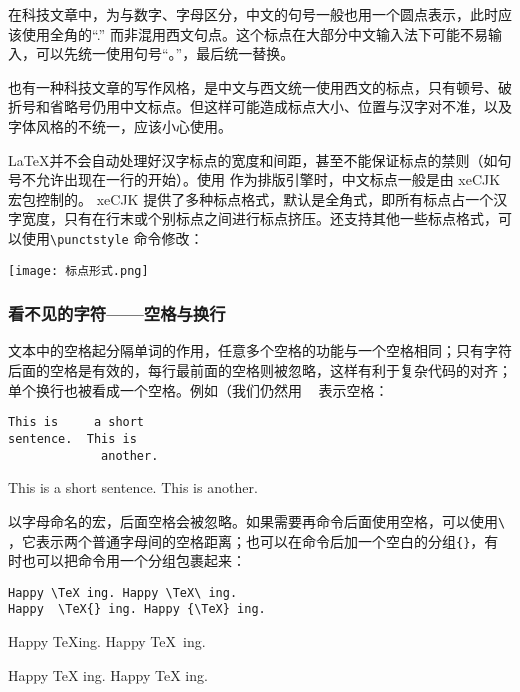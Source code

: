 在科技文章中，为与数字、字母区分，中文的句号一般也用一个圆点表示，此时应该使用全角的“.” 而非混用西文句点。这个标点在大部分中文输入法下可能不易输入，可以先统一使用句号“。”，最后统一替换。

也有一种科技文章的写作风格，是中文与西文统一使用西文的标点，只有顿号、破折号和省略号仍用中文标点。但这样可能造成标点大小、位置与汉字对不准，以及字体风格的不统一，应该小心使用。

\LaTeX 并不会自动处理好汉字标点的宽度和间距，甚至不能保证标点的禁则（如句号不允许出现在一行的开始）。使用 \XeTeX 作为排版引擎时，中文标点一般是由 xeCJK 宏包控制的。 xeCJK 提供了多种标点格式，默认是全角式，即所有标点占一个汉字宽度，只有在行末或个别标点之间进行标点挤压。还支持其他一些标点格式，可以使用\verb|\punctstyle| 命令修改：

\begin{center}
    \texttt{[image: 标点形式.png]} \centering
\end{center}

\subsubsection{看不见的字符——空格与换行}\label{sec:space}

文本中的空格起分隔单词的作用，任意多个空格的功能与一个空格相同；只有字符后面的空格是有效的，每行最前面的空格则被忽略，这样有利于复杂代码的对齐；单个换行也被看成一个空格。例如（我们仍然用 \lstinline[showspaces=true]{ } 表示空格：

\begin{minipage}[t]{0.45\textwidth}
    \begin{lstlisting}[showspaces=true]
This is     a short
sentence.  This is
             another.
\end{lstlisting}
\end{minipage}
\hfill
\begin{minipage}[c]{0.45\textwidth}
This is     a short
sentence.  This is
             another.
\end{minipage}

以字母命名的宏，后面空格会被忽略。如果需要再命令后面使用空格，可以使用\lstinline[showspaces=true]{\ }，它表示两个普通字母间的空格距离；也可以在命令后加一个空白的分组\verb|{}|，有时也可以把命令用一个分组包裹起来：

\begin{minipage}[t]{0.45\textwidth}
\begin{lstlisting}[showspaces=true]
Happy \TeX ing. Happy \TeX\ ing.
Happy  \TeX{} ing. Happy {\TeX} ing.
\end{lstlisting}
\end{minipage}
\hfill
\begin{minipage}[t]{0.45\textwidth}
Happy \TeX ing. Happy \TeX\ ing.

Happy  \TeX{} ing. Happy {\TeX} ing.
\end{minipage}


